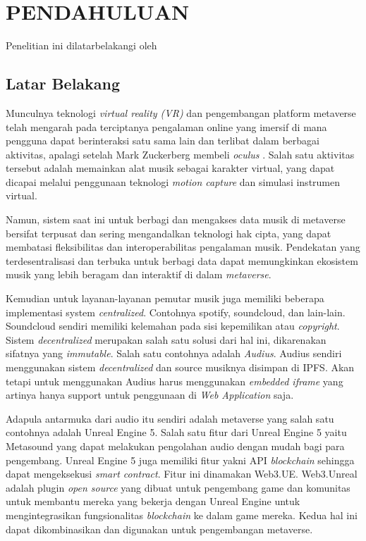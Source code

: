 \chapter{PENDAHULUAN}
\label{chap:pendahuluan}


Penelitian ini dilatarbelakangi oleh \lipsum[1][1-5]

\section{Latar Belakang}
\label{sec:latarbelakang}

Munculnya teknologi \emph{virtual reality (VR)} dan pengembangan platform metaverse telah mengarah pada terciptanya
pengalaman online yang imersif di mana pengguna dapat berinteraksi satu sama lain dan terlibat dalam berbagai aktivitas, apalagi setelah  Mark Zuckerberg
membeli \emph{oculus} \parencite{luckerson2014facebook}.
Salah satu aktivitas tersebut adalah memainkan alat musik sebagai karakter virtual, yang dapat dicapai melalui penggunaan
teknologi \emph{motion capture} dan simulasi instrumen virtual.

Namun, sistem saat ini untuk berbagi dan mengakses data musik di metaverse bersifat terpusat dan sering mengandalkan teknologi
hak cipta, yang dapat membatasi fleksibilitas dan interoperabilitas pengalaman musik. Pendekatan yang terdesentralisasi dan terbuka
untuk berbagi data dapat memungkinkan ekosistem musik yang lebih beragam dan interaktif di dalam \emph{metaverse}.

Kemudian untuk layanan-layanan pemutar musik juga memiliki beberapa implementasi system \emph{centralized}. Contohnya spotify, soundcloud, dan lain-lain.
Soundcloud sendiri memiliki kelemahan pada sisi kepemilikan atau \emph{copyright}. Sistem \emph{decentralized} merupakan salah satu solusi dari hal ini, dikarenakan
sifatnya yang \emph{immutable}. Salah satu contohnya adalah \emph{Audius}. Audius sendiri menggunakan sistem \emph{decentralized} dan source musiknya disimpan di IPFS.
Akan tetapi untuk menggunakan Audius harus menggunakan \emph{embedded iframe} yang artinya hanya support untuk penggunaan di \emph{Web Application} saja.

Adapula antarmuka dari audio itu sendiri adalah metaverse yang salah satu contohnya adalah Unreal Engine 5. Salah satu fitur dari Unreal Engine 5 yaitu Metasound yang dapat melakukan pengolahan audio dengan mudah bagi para pengembang. Unreal Engine 5 juga
memiliki fitur yakni API \emph{blockchain} sehingga dapat mengeksekusi \emph{smart contract}. Fitur ini dinamakan Web3.UE. Web3.Unreal adalah plugin
\emph{open source} yang dibuat untuk pengembang game dan komunitas untuk membantu mereka yang bekerja dengan Unreal Engine untuk mengintegrasikan
fungsionalitas \emph{blockchain} ke dalam game mereka. Kedua hal ini dapat dikombinasikan dan digunakan untuk
pengembangan metaverse.

